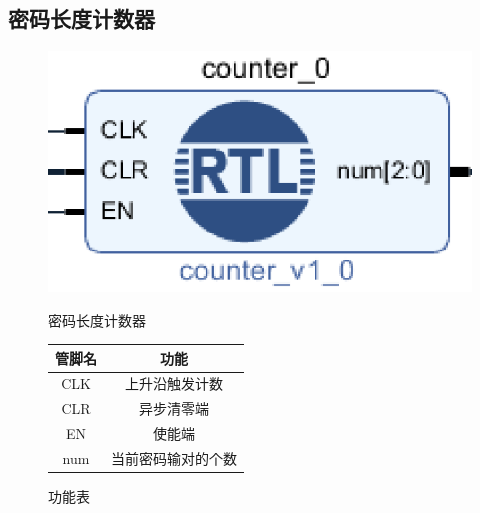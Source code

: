 \documentclass[a4paper,11pt]{ctexart}
\begin{document}
\subsection{密码长度计数器}
\begin{figure}[htb]
  \begin{minipage}[b]{0.5\textwidth}
    \centering
    \includegraphics[width = \textwidth]{./images/counter.eps}
    \caption{密码长度计数器}
    \label{fig:by:table}
  \end{minipage}%
  \begin{minipage}[b]{0.5\textwidth}
    \centering
    \begin{tabular}{|c|c|} \hline
      管脚名 & 功能                                            \\ \hline\hline
      CLK       &   上升沿触发计数      \\
      CLR       & 异步清零端                     \\
      EN        & 使能端                             \\
      num       & 当前密码输对的个数    \\ \hline
    \end{tabular}
    \caption{功能表}
    \label{table:by:fig}
  \end{minipage}
\end{figure}
\end{document}
